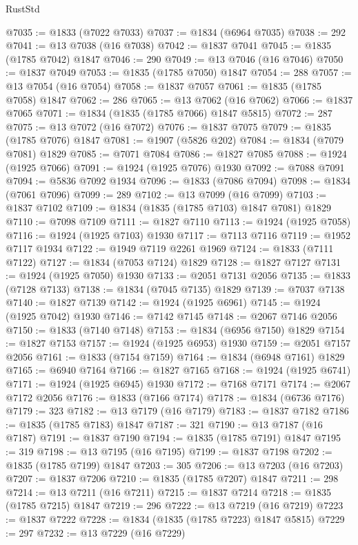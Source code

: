 \begin{lexlean}{RustStd}
\begin{coremodule}
{\begin{coremodule}
{{{{{@7035 := @1833 (@7022 @7033)
@7037 := @1834 (@6964 @7035)
@7038 := 292
@7041 := @13 @7038 (@16 @7038)
@7042 := @1837 @7041
@7045 := @1835 (@1785 @7042) @1847
@7046 := 290
@7049 := @13 @7046 (@16 @7046)
@7050 := @1837 @7049
@7053 := @1835 (@1785 @7050) @1847
@7054 := 288
@7057 := @13 @7054 (@16 @7054)
@7058 := @1837 @7057
@7061 := @1835 (@1785 @7058) @1847
@7062 := 286
@7065 := @13 @7062 (@16 @7062)
@7066 := @1837 @7065
@7071 := @1834 (@1835 (@1785 @7066) @1847 @5815)
@7072 := 287
@7075 := @13 @7072 (@16 @7072)
@7076 := @1837 @7075
@7079 := @1835 (@1785 @7076) @1847
@7081 := @1907 (@5826 @202)
@7084 := @1834 (@7079 @7081) @1829
@7085 := @7071 @7084
@7086 := @1827 @7085
@7088 := @1924 (@1925 @7066)
@7091 := @1924 (@1925 @7076) @1930
@7092 := @7088 @7091
@7094 := @5836 @7092 @1934
@7096 := @1833 (@7086 @7094)
@7098 := @1834 (@7061 @7096)
@7099 := 289
@7102 := @13 @7099 (@16 @7099)
@7103 := @1837 @7102
@7109 := @1834 (@1835 (@1785 @7103) @1847 @7081) @1829
@7110 := @7098 @7109
@7111 := @1827 @7110
@7113 := @1924 (@1925 @7058)
@7116 := @1924 (@1925 @7103) @1930
@7117 := @7113 @7116
@7119 := @1952 @7117 @1934
@7122 := @1949 @7119 @2261 @1969
@7124 := @1833 (@7111 @7122)
@7127 := @1834 (@7053 @7124) @1829
@7128 := @1827 @7127
@7131 := @1924 (@1925 @7050) @1930
@7133 := @2051 @7131 @2056
@7135 := @1833 (@7128 @7133)
@7138 := @1834 (@7045 @7135) @1829
@7139 := @7037 @7138
@7140 := @1827 @7139
@7142 := @1924 (@1925 @6961)
@7145 := @1924 (@1925 @7042) @1930
@7146 := @7142 @7145
@7148 := @2067 @7146 @2056
@7150 := @1833 (@7140 @7148)
@7153 := @1834 (@6956 @7150) @1829
@7154 := @1827 @7153
@7157 := @1924 (@1925 @6953) @1930
@7159 := @2051 @7157 @2056
@7161 := @1833 (@7154 @7159)
@7164 := @1834 (@6948 @7161) @1829
@7165 := @6940 @7164
@7166 := @1827 @7165
@7168 := @1924 (@1925 @6741)
@7171 := @1924 (@1925 @6945) @1930
@7172 := @7168 @7171
@7174 := @2067 @7172 @2056
@7176 := @1833 (@7166 @7174)
@7178 := @1834 (@6736 @7176)
@7179 := 323
@7182 := @13 @7179 (@16 @7179)
@7183 := @1837 @7182
@7186 := @1835 (@1785 @7183) @1847
@7187 := 321
@7190 := @13 @7187 (@16 @7187)
@7191 := @1837 @7190
@7194 := @1835 (@1785 @7191) @1847
@7195 := 319
@7198 := @13 @7195 (@16 @7195)
@7199 := @1837 @7198
@7202 := @1835 (@1785 @7199) @1847
@7203 := 305
@7206 := @13 @7203 (@16 @7203)
@7207 := @1837 @7206
@7210 := @1835 (@1785 @7207) @1847
@7211 := 298
@7214 := @13 @7211 (@16 @7211)
@7215 := @1837 @7214
@7218 := @1835 (@1785 @7215) @1847
@7219 := 296
@7222 := @13 @7219 (@16 @7219)
@7223 := @1837 @7222
@7228 := @1834 (@1835 (@1785 @7223) @1847 @5815)
@7229 := 297
@7232 := @13 @7229 (@16 @7229)
}}}}}
\end{coremodule}}
\end{coremodule}
\end{lexlean}
